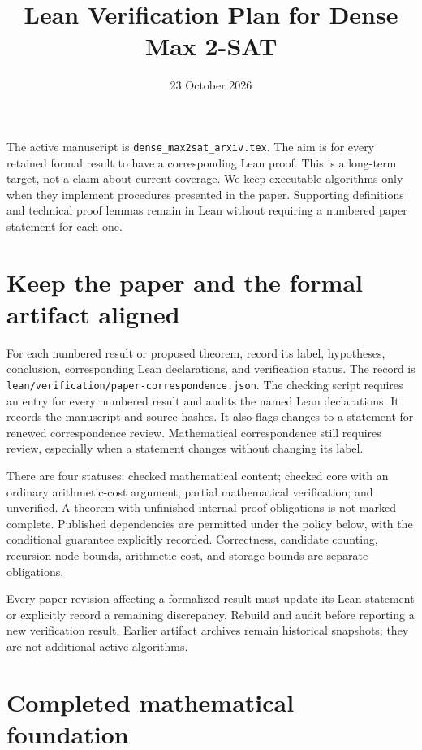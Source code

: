 \documentclass[11pt,a4paper]{article}
\title{Lean Verification Plan for Dense Max 2-SAT}
\author{}
\date{23 October 2026}
\begin{document}
\maketitle

The active manuscript is \texttt{dense\_max2sat\_arxiv.tex}. The aim is
for every retained formal result to have a corresponding Lean proof.
This is a long-term target, not a claim about current coverage. We keep
executable algorithms only when they implement procedures presented in
the paper. Supporting definitions and technical proof lemmas remain in
Lean without requiring a numbered paper statement for each one.

\section{Keep the paper and the formal artifact aligned}

For each numbered result or proposed theorem, record its label, hypotheses, conclusion,
corresponding Lean declarations, and verification status. The record is
\texttt{lean/verification/paper-correspondence.json}. The checking script
requires an entry for every numbered result and audits the named Lean
declarations. It records the manuscript and source hashes. It also flags changes to a statement for renewed correspondence review.
Mathematical correspondence still requires review,
especially when a statement changes without changing its label.

There are four statuses: checked mathematical content; checked core with
an ordinary arithmetic-cost argument; partial mathematical verification;
and unverified. A theorem with unfinished internal proof obligations is
not marked complete. Published dependencies are permitted under the policy
below, with the conditional guarantee explicitly recorded. Correctness, candidate counting, recursion-node
bounds, arithmetic cost, and storage bounds are separate obligations.

Every paper revision affecting a formalized result must update its Lean
statement or explicitly record a remaining discrepancy. Rebuild and audit
before reporting a new verification result. Earlier artifact archives
remain historical snapshots; they are not additional active algorithms.

\section{Completed mathematical foundation}
\end{document}
